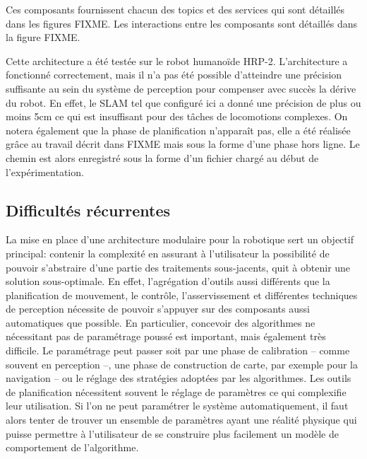 Ces composants fournissent chacun des topics et des services qui sont
détaillés dans les figures FIXME. Les interactions entre les
composants sont détaillés dans la figure FIXME.


Cette architecture a été testée sur le robot humanoïde
HRP-2. L'architecture a fonctionné correctement, mais il n'a pas été
possible d'atteindre une précision suffisante au sein du système de
perception pour compenser avec succès la dérive du robot. En effet, le
SLAM tel que configuré ici a donné une précision de plus ou moins 5cm
ce qui est insuffisant pour des tâches de locomotions complexes. On
notera également que la phase de planification n'apparaît pas, elle a
été réalisée grâce au travail décrit dans FIXME mais sous la forme
d'une phase hors ligne. Le chemin est alors enregistré sous la forme
d'un fichier chargé au début de l'expérimentation.


\subsection{Difficultés récurrentes}

La mise en place d'une architecture modulaire pour la robotique sert
un objectif principal: contenir la complexité en assurant à
l'utilisateur la possibilité de pouvoir s'abstraire d'une partie des
traitements sous-jacents, quit à obtenir une solution
sous-optimale. En effet, l'agrégation d'outils aussi différents que la
planification de mouvement, le contrôle, l'asservissement et
différentes techniques de perception nécessite de pouvoir s'appuyer
sur des composants aussi automatiques que possible. En particulier,
concevoir des algorithmes ne nécessitant pas de paramétrage poussé est
important, mais également très difficile. Le paramétrage peut passer
soit par une phase de calibration -- comme souvent en perception --,
une phase de construction de carte, par exemple pour la navigation --
ou le réglage des stratégies adoptées par les algorithmes. Les outils
de planification nécessitent souvent le réglage de paramètres ce qui
complexifie leur utilisation. Si l'on ne peut paramétrer le système
automatiquement, il faut alors tenter de trouver un ensemble de
paramètres ayant une réalité physique qui puisse permettre à
l'utilisateur de se construire plus facilement un modèle de
comportement de l'algorithme.


